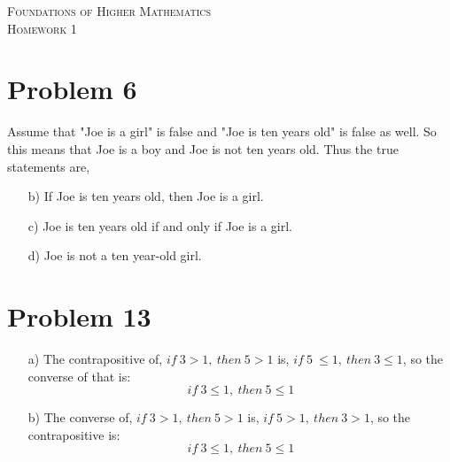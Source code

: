 \documentclass{article}
\newcommand{\classname}{
Foundations of Higher Mathematics
}
\newcommand{\assignment}{
1
}
\begin{document}
\begin{center}
\textsc{\Large \classname}\\[.3cm]
\textsc{\Large Homework \assignment}
\end{center}

\section*{Problem 6}
Assume that "Joe is a girl" is false and "Joe is ten years old" is false as well. So this means that Joe is a boy and Joe is not ten years old. Thus the true statements are,
\begin{enumerate}
\item[b)] If Joe is ten years old, then Joe is a girl.
\item[c)] Joe is ten years old if and only if Joe is a girl.
\item[d)] Joe is not a ten year-old girl.
\end{enumerate}

\section*{Problem 13}
\begin{enumerate}
    \item[a)] The contrapositive of, 
    $if\ 3 > 1,\ then\ 5 > 1$ is, $if\ 5\ \leq 1,\ then\ 3 \leq 1$, 
    so the converse of that is: $$if\ 3 \leq 1,\ then\ 5 \leq 1$$
    
    \item[b)] The converse of, 
    $if\ 3 > 1,\ then\ 5 > 1$ is, $if\ 5 > 1,\ then\ 3 > 1$,
    so the contrapositive is:
    $$if\ 3 \leq 1,\ then\ 5 \leq 1$$
\end{enumerate}
\end{document}
